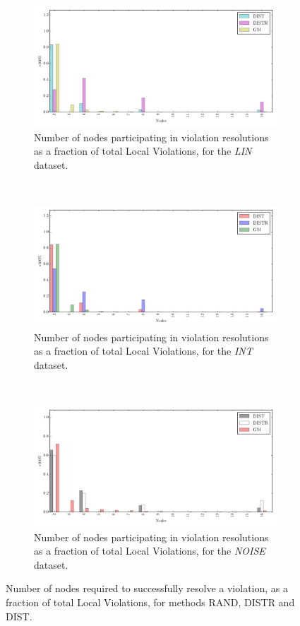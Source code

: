 \begin{figure}[!htb]\centering
\vspace{-1.5cm}
\begin{subfigure}{\textwidth}
	\centering
  \includegraphics[width=0.75\linewidth]{img/matchings_matchings_linear.pdf}
  \caption{Number of nodes participating in violation resolutions as a fraction of total Local Violations, for the \emph{LIN} dataset.}
\end{subfigure}\hfill\\[1.5em]
\begin{subfigure}{\textwidth}
\centering
  \includegraphics[width=0.75\linewidth]{img/matchings_matchings_interweaving.pdf}
  \caption{Number of nodes participating in violation resolutions as a fraction of total Local Violations, for the \emph{INT} dataset.}
\end{subfigure}\hfill\\[1.5em]
\begin{subfigure}{\textwidth}%
\centering
  \includegraphics[width=0.75\linewidth]{img/matchings_matchings_noisyinterweaving.pdf}
  \caption{Number of nodes participating in violation resolutions as a fraction of total Local Violations, for the \emph{NOISE} dataset.}
\end{subfigure}
\vspace{0.5cm}
\caption{Number of nodes required to successfully resolve a violation, as a fraction of total Local Violations, for methods RAND, DISTR and DIST.} \label{fig:matchingComp-matchings}
\end{figure}

